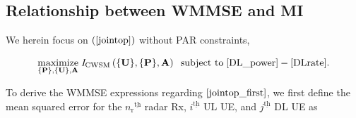 \documentclass[10pt,journal]{IEEEtran}
\newcommand{\paren}[1]{\left({#1}\right)}
\newcommand{\braces}[1]{{\left\{ {#1}\right\}}}
\newcommand{\ith}[1]    {{#1}^{\underline{\text{th}}}}
\newcommand{\rr}{_\mathrm{r}}
\newcommand{\B}{\textrm{B}}
\theoremstyle{definition}
\begin{document}
	\subsection{Relationship between WMMSE and MI}
	\label{subsec: MMSE section}
	We herein focus on $\paren{\mathrm{\ref{jointop}}}$ without PAR constraints,
	\par\noindent\small
	\begin{equation}\label{jointop_first}
		\underset{{\braces{\mathbf{P}},\braces{\mathbf{U}},
				\mathbf{A}}}{\text{maximize}}\; \mathit{I}_{\textrm{CWSM}}\paren{\braces{\mathbf{U}},\braces{\mathbf{P}},\mathbf{A}}\;\;\text{subject to}\; %
		\eqref{DL_power}-\eqref{DLrate}.
	\end{equation}\normalsize

	To derive the WMMSE expressions regarding $\ref{jointop_first}$, we first define the mean squared error for the $\ith{n\rr}$ radar Rx, $\ith{i}$ UL UE, and $\ith{j}$ DL UE as \par\noindent\small
	\iffalse
\end{document}
